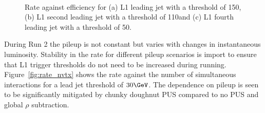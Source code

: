 \begin{figure}[h!]
  \centering
    ~
    \\
  \caption{\label{fig:rate_eff_jets} Rate against efficiency for (a) L1 leading jet with a threshold of 150\GeV, 
  (b) L1 second leading jet with a threshold of 110\GeV and (c) L1 fourth leading jet with a threshold of 50\GeV.}
\end{figure}

During Run 2 the pileup is not constant but varies with changes in instantaneous luminosity. 
Stability in the rate for different pileup scenarios is import to ensure that L1 trigger thresholds 
do not need to be increased during running. Figure~\ref{fig:rate_nvtx} shows the rate against the number of 
simultaneous interactions for a lead jet threshold of $30\GeV$. The dependence on pileup is 
seen to be significantly mitigated by chunky doughnut PUS compared to no PUS and global $\rho$
subtraction. 

